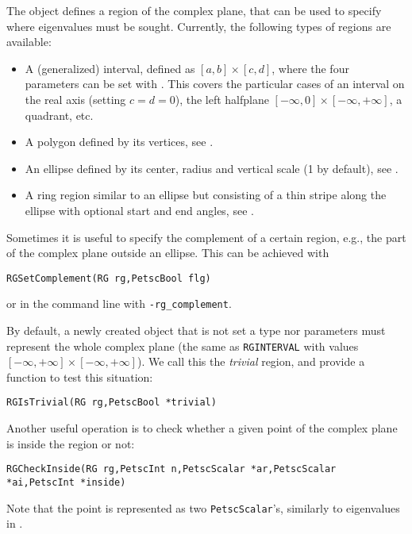 The  object defines a region of the complex plane, that can be used to specify where eigenvalues must be sought. Currently, the following types of regions are available:
\begin{itemize}
\setlength{\itemsep}{0mm}
\item A (generalized) interval, defined as $[a,b]\times[c,d]$, where the four parameters can be set with . This covers the particular cases of an interval on the real axis (setting $c=d=0$), the left halfplane $[-\infty,0]\times[-\infty,+\infty]$, a quadrant, etc.
\item A polygon defined by its vertices, see .
\item An ellipse defined by its center, radius and vertical scale (1 by default), see .
\item A ring region similar to an ellipse but consisting of a thin stripe along the ellipse with optional start and end angles, see .
\end{itemize}

Sometimes it is useful to specify the complement of a certain region, e.g., the part of the complex plane outside an ellipse. This can be achieved with
	\begin{Verbatim}[fontsize=\small]
        RGSetComplement(RG rg,PetscBool flg)
	\end{Verbatim}
or in the command line with \Verb!-rg_complement!.

By default, a newly created  object that is not set a type nor parameters must represent the whole complex plane (the same as \texttt{RGINTERVAL} with values $[-\infty,+\infty]\times[-\infty,+\infty]$). We call this the \emph{trivial} region, and provide a function to test this situation:
	\begin{Verbatim}[fontsize=\small]
        RGIsTrivial(RG rg,PetscBool *trivial)
	\end{Verbatim}

Another useful operation is to check whether a given point of the complex plane is inside the region or not:
	\begin{Verbatim}[fontsize=\small]
        RGCheckInside(RG rg,PetscInt n,PetscScalar *ar,PetscScalar *ai,PetscInt *inside)
	\end{Verbatim}
Note that the point is represented as two \texttt{PetscScalar}'s, similarly to eigenvalues in \slepc.


